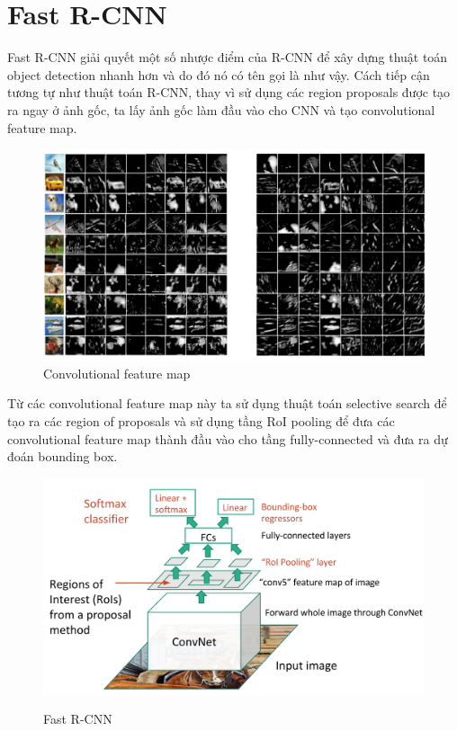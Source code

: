 \section{Fast R-CNN}
Fast R-CNN giải quyết một số nhược điểm của R-CNN để xây dựng thuật toán object detection nhanh hơn và do đó nó có tên gọi là như vậy. Cách tiếp cận tương tự như thuật toán R-CNN, thay vì sử dụng các region proposals được tạo ra ngay ở ảnh gốc, ta lấy ảnh gốc làm đầu vào cho CNN và tạo convolutional feature map.
\begin{figure}[H]
\begin{center}
\includegraphics[scale=0.4]{chap4/image/featureMap.png}
\end{center}
\caption{Convolutional feature map}
\label{fig:convFeatureMap11}
\end{figure}
Từ các convolutional feature map này ta sử dụng thuật toán selective search để tạo ra các region of proposals và sử dụng tầng RoI pooling để đưa các convolutional feature map thành đầu vào cho tầng fully-connected và đưa ra dự đoán bounding box.
\begin{figure}[H]
\begin{center}
\label{fig:convFeatureMap}
\includegraphics[scale= 0.8]{chap4/image/fastrcnn2.png}
\caption{Fast R-CNN}
\end{center}
\end{figure}
